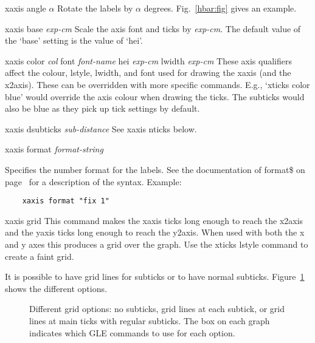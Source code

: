 \begin{commanddescription}
\item[{\sf xaxis angle $\alpha$}]
Rotate the labels by $\alpha$ degrees. Fig.~\ref{hbar:fig} gives an example.

\item[{\sf xaxis base {\it exp-cm}} ]
Scale the axis font and ticks by {\it exp-cm}. The default value of the `{\sf base}' setting is the value of `{\sf hei}'.

\item[{\sf xaxis color {\it col} font {\it font-name}  hei {\it exp-cm} lwidth {\it exp-cm}} ]
These axis qualifiers affect the colour, lstyle, lwidth, and font used for drawing the xaxis (and the x2axis).  These can be overridden with more specific commands. E.g., `{\sf xticks color blue}' would override the axis colour when drawing the ticks. The subticks would also be blue as they pick up tick settings by default.

\item[{\sf xaxis dsubticks {\it sub-distance} }  ]
See {\sf xaxis nticks} below.

\item[{\sf xaxis format {\it format-string}} ]

Specifies the number format for the labels. See the documentation of {\sf format\$} on page~\pageref{formatnum:pg} for a description of the syntax. Example:

\preglecode{}
\begin{Verbatim}
	xaxis format "fix 1"
\end{Verbatim}
\postglecode{}

\item[{\sf xaxis grid }  ]
This command makes the xaxis ticks long enough to reach the x2axis and the yaxis ticks long enough to reach the y2axis. When used with both the x and y axes this produces a grid over the graph. Use the {\sf xticks lstyle} command to create a faint grid.

It is possible to have grid lines for subticks or to have normal subticks. Figure~\ref{gridmode:fig} shows the different options.

\begin{figure}[tb]
\centering

\caption{\label{gridmode:fig}Different grid options: no subticks, grid lines at each subtick, or grid lines at main ticks with regular subticks. The box on each graph indicates which GLE commands to use for each option.}
\end{figure}


\end{commanddescription}
